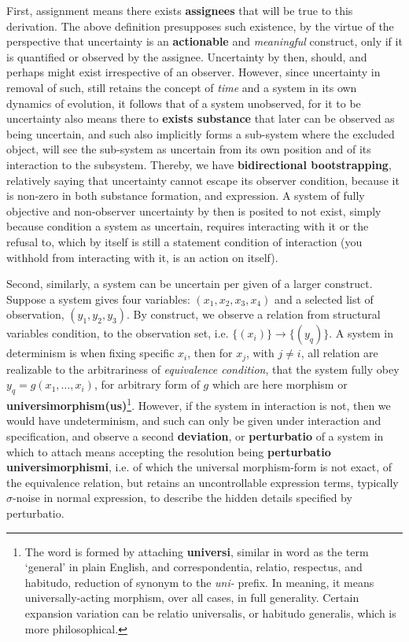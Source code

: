 First, assignment means there exists \textbf{assignees} that will be true to this derivation. The above definition presupposes such existence, by the virtue of the perspective that uncertainty is an \textbf{actionable} and \textit{meaningful} construct, only if it is quantified or observed by the assignee. Uncertainty by then, should, and perhaps might exist irrespective of an observer. However, since uncertainty in removal of such, still retains the concept of \textit{time} and a system in its own dynamics of evolution, it follows that of a system unobserved, for it to be uncertainty also means there to \textbf{exists substance} that later can be observed as being uncertain, and such also implicitly forms a sub-system where the excluded object, will see the sub-system as uncertain from its own position and of its interaction to the subsystem. Thereby, we have \textbf{bidirectional bootstrapping}, relatively saying that uncertainty cannot escape its observer condition, because it is non-zero in both substance formation, and expression. A system of fully objective and non-observer uncertainty by then is posited to not exist, simply because condition a system as uncertain, requires interacting with it or the refusal to, which by itself is still a statement condition of interaction (you withhold from interacting with it, is an action on itself).

Second, similarly, a system can be uncertain per given of a larger construct. Suppose a system gives four variables: $(x_1, x_2, x_3, x_4)$ and a selected list of observation, $(y_{1},y_{2},y_{3})$. By construct, we observe a relation from structural variables condition, to the observation set, i.e. $\{(x_{i})\}\to \{(y_{q})\}$. A system in determinism is when fixing specific $x_{i}$, then for $x_{j}$, with $j\neq i$, all relation are realizable to the arbitrariness of \textit{equivalence condition}, that the system fully obey $y_{q}=g(x_{1},\dots,x_{i})$, for arbitrary form of $g$ which are here morphism or \textbf{universimorphism(us)}\footnote{The word is formed by attaching \textbf{universi}, similar in word as the term `general' in plain English, and correspondentia, relatio, respectus, and habitudo, reduction of synonym to the \textit{uni-} prefix. In meaning, it means universally-acting morphism, over all cases, in full generality. Certain expansion variation can be relatio universalis, or habitudo generalis, which is more philosophical.}. However, if the system in interaction is not, then we would have undeterminism, and such can only be given under interaction and specification, and observe a second \textbf{deviation}, or \textbf{perturbatio} of a system in which to attach means accepting the resolution being \textbf{perturbatio universimorphismi}, i.e. of which the universal morphism-form is not exact, of the equivalence relation, but retains an uncontrollable expression terms, typically $\sigma$-noise in normal expression, to describe the hidden details specified by perturbatio. 

